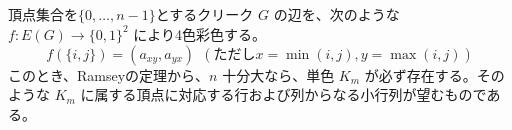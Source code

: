 \subsection{}
頂点集合を$\{0,\ldots,n-1\}$とするクリーク $G$ の辺を、次のような $f:E(G)\to \{0,1\}^2$ により4色彩色する。
$$
f(\{i,j\})=(a_{xy},a_{yx}) \ \ (\text{ただし$x=\min(i,j),y=\max(i,j)$})
$$
このとき、Ramseyの定理から、$n$ 十分大なら、単色 $K_m$ が必ず存在する。そのような $K_m$ に属する頂点に対応する行および列からなる小行列が望むものである。
